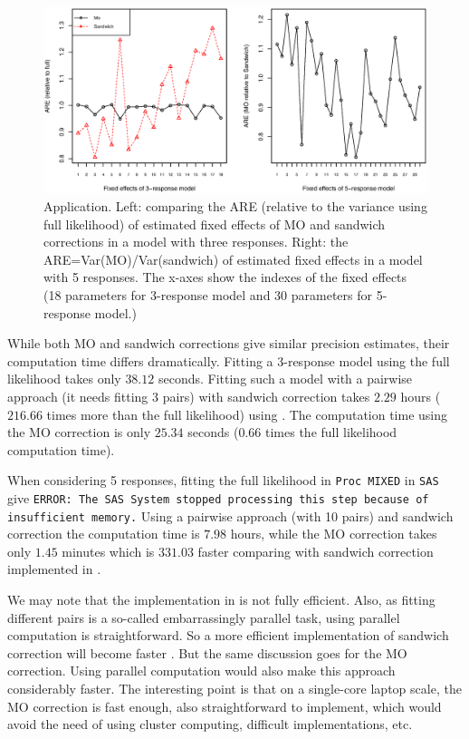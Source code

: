 \documentclass[11pt,a5paper,twoside]{book}
\begin{document}
\begin{figure}[htb]
\begin{center}
\includegraphics[trim=0 75 0 20,width=\textwidth]{fig_hear_new.eps}
\caption[Application (hearing data)]{Application. Left: comparing the ARE (relative to the variance using full likelihood) of estimated fixed effects of MO and sandwich corrections in a model with three responses. Right: the ARE=Var(MO)/Var(sandwich) of estimated fixed effects in a model with 5 responses. The x-axes show the indexes of the fixed effects (18 parameters for 3-response model and 30 parameters for 5-response model.)}
\label{fig_app}
\end{center}
\end{figure}

While both MO and sandwich corrections give similar precision estimates, their computation time differs dramatically. Fitting a 3-response model using the full likelihood takes only $38.12$ seconds. Fitting such a model  with a pairwise approach (it needs fitting 3 pairs) with sandwich correction takes $2.29$ hours ($216.66$ times more than the full likelihood) using \cite{pair_lin}. The computation time using the MO correction is only $25.34$ seconds ($0.66$ times the full likelihood computation time).

When considering 5 responses, fitting the full likelihood in {\tt{Proc MIXED}} in {\tt{SAS}} give {\tt{ERROR: The SAS System stopped processing this step because of insufficient memory.}} Using a pairwise approach (with 10 pairs) and sandwich correction the computation time is $7.98$ hours, while the MO correction takes only $1.45$ minutes which is $331.03$ faster comparing with sandwich correction implemented in \cite{pair_lin}.   

We may note that the implementation in \cite{pair_lin} is not fully efficient. Also, as fitting different pairs is a so-called embarrassingly parallel task, using parallel computation is straightforward. So a more efficient implementation of sandwich correction will become faster \citep[as an example]{ivanova2015}. But the same discussion goes for the MO correction. Using parallel computation would also make this approach considerably faster. The interesting point is that on a single-core laptop scale, the MO correction is fast enough, also straightforward to implement, which would avoid the need of using cluster computing, difficult implementations, etc.
\end{document}
